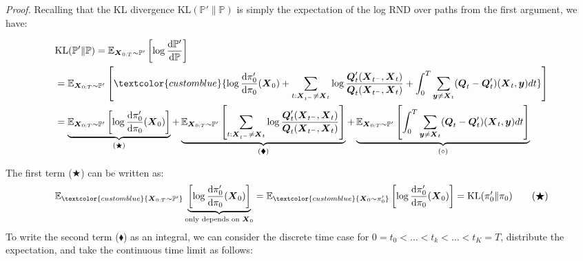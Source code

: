\documentclass{article}
\newcommand{\bluetext}[1]{\textcolor{customblue}{#1}}
\begin{document}
\textit{Proof.} Recalling that the KL divergence $\text{KL}(\mathbb{P}'\|\mathbb{P})$ is simply the expectation of the log RND over paths from the first argument, we have:
\begin{small}
\begin{align}
    &\text{KL}(\mathbb{P}'\|\mathbb{P})=\mathbb{E}_{\boldsymbol{X}_{0:T}\sim \mathbb{P}'}\left[\log \frac{\mathrm{d}\mathbb{P}'}{\mathrm{d}\mathbb{P}}\right]\nonumber\\
    &=\mathbb{E}_{\boldsymbol{X}_{0:T}\sim \mathbb{P}'}\left[\bluetext{\log \frac{\mathrm{d}\pi_0'}{\mathrm{d}\pi_0}(\boldsymbol{X}_0)+\sum_{t:\boldsymbol{X}_{t^-}\neq \boldsymbol{X}_t}\log \frac{\boldsymbol{Q}_t'(\boldsymbol{X}_{t^-}, \boldsymbol{X}_t)}{\boldsymbol{Q}_t(\boldsymbol{X}_{t^-}, \boldsymbol{X}_t)}+\int_0^T\sum_{\boldsymbol{y}\neq\boldsymbol{X}_t}(\boldsymbol{Q}_t-\boldsymbol{Q}'_t)(\boldsymbol{X}_t,\boldsymbol{y})dt}\right]\nonumber\\
    &=\underbrace{\mathbb{E}_{\boldsymbol{X}_{0:T}\sim \mathbb{P}'}\left[\log \frac{\mathrm{d}\pi_0'}{\mathrm{d}\pi_0}(\boldsymbol{X}_0)\right]}_{(\bigstar)}+\underbrace{\mathbb{E}_{\boldsymbol{X}_{0:T}\sim \mathbb{P}'}\left[\sum_{t:\boldsymbol{X}_{t^-}\neq \boldsymbol{X}_t}\log \frac{\boldsymbol{Q}_t'(\boldsymbol{X}_{t^-}, \boldsymbol{X}_t)}{\boldsymbol{Q}_t(\boldsymbol{X}_{t^-}, \boldsymbol{X}_t)}\right]}_{(\blacklozenge)}+\underbrace{\mathbb{E}_{\boldsymbol{X}_{0:T}\sim \mathbb{P}'}\left[\int_0^T\sum_{\boldsymbol{y}\neq\boldsymbol{X}_t}(\boldsymbol{Q}_t-\boldsymbol{Q}'_t)(\boldsymbol{X}_t,\boldsymbol{y})dt\right]}_{(\diamond)}\label{eq:ctmc-kl-div1}
\end{align}
\end{small}
The first term ($\bigstar$) can be written as:
\begin{align}
    \mathbb{E}_{\bluetext{\boldsymbol{X}_{0:T}\sim \mathbb{P}'}}\underbrace{\left[\log \frac{\mathrm{d}\pi_0'}{\mathrm{d}\pi_0}(\boldsymbol{X}_0)\right]}_{\text{only depends on }\boldsymbol{X}_0}=\mathbb{E}_{\bluetext{\boldsymbol{X}_{0}\sim \pi'_0}}\left[\log \frac{\mathrm{d}\pi_0'}{\mathrm{d}\pi_0}(\boldsymbol{X}_0)\right]=\text{KL}(\pi'_0\|\pi_0)\tag{$\bigstar$}
\end{align}
To write the second term ($\blacklozenge$) as an integral, we can consider the discrete time case for $0=t_0< \dots< t_k< \dots< t_K=T$, distribute the expectation, and take the continuous time limit as follows:
\end{document}
